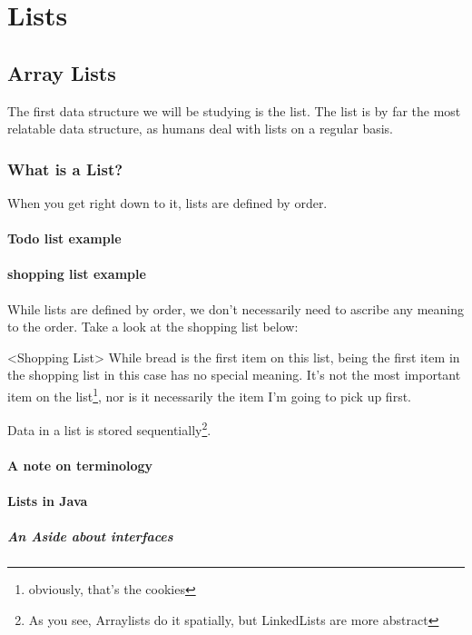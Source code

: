 
\part{Lists}
\label{part-list}
\chapter{Array Lists}
\label{chap-arraylist}

The first data structure we will be studying is the list.
The list is by far the most relatable data structure, as humans deal with lists on a regular basis.

\section{What is a List?}


When you get right down to it, lists are defined by order.


\subsection*{Todo list example}


\subsection*{shopping list example}
While lists are defined by order, we don't necessarily  need to ascribe any meaning to the order.
Take a look at the shopping list below:




<Shopping List>
While bread is the first item on this list, being the first item in the shopping list in this case has no special meaning.  It's not the most important item on the list\footnote{obviously, that's the cookies}, nor is it necessarily the item I'm going to pick up first.


Data in a list is stored sequentially\footnote{As you see, Arraylists do it spatially, but LinkedLists are more abstract}.


\subsection{A note on terminology}
\subsection{Lists in Java}
\subsubsection{An Aside about interfaces}
